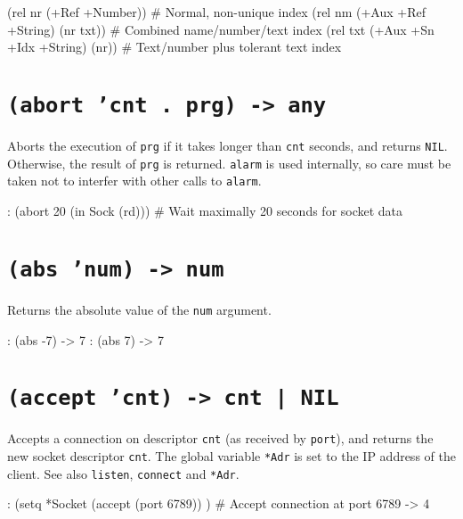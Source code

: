 \begin{wideverbatim}
(rel nr (+Ref +Number))                # Normal, non-unique index
(rel nm (+Aux +Ref +String) (nr txt))  # Combined name/number/text index
(rel txt (+Aux +Sn +Idx +String) (nr)) # Text/number plus tolerant text index
\end{wideverbatim}

 
\section*{\texttt{(abort 'cnt . prg) -> any}}
\label{sec:func-ref-A-(abort 'cnt . prg) -> any}


Aborts the execution of \texttt{prg} if it takes longer than \texttt{cnt} seconds, and
returns \texttt{NIL}. Otherwise, the result of \texttt{prg} is returned. \texttt{alarm} is
used internally, so care must be taken not to interfer with other calls
to \texttt{alarm}.


\begin{wideverbatim}
: (abort 20 (in Sock (rd)))  # Wait maximally 20 seconds for socket data
\end{wideverbatim}

 
\section*{\texttt{(abs 'num) -> num}}
\label{sec:func-ref-A-(abs 'num) -> num}


Returns the absolute value of the \texttt{num} argument.


\begin{wideverbatim}
: (abs -7)
-> 7
: (abs 7)
-> 7
\end{wideverbatim}

 
\section*{\texttt{(accept 'cnt) -> cnt | NIL}}
\label{sec:func-ref-A-(accept 'cnt) -> cnt | NIL}


Accepts a connection on descriptor \texttt{cnt} (as received by \texttt{port}), and
returns the new socket descriptor \texttt{cnt}. The global variable \texttt{*Adr} is
set to the IP address of the client. See also \texttt{listen}, \texttt{connect} and
\texttt{*Adr}.


\begin{wideverbatim}
: (setq *Socket
   (accept (port 6789)) )  # Accept connection at port 6789
-> 4
\end{wideverbatim}

